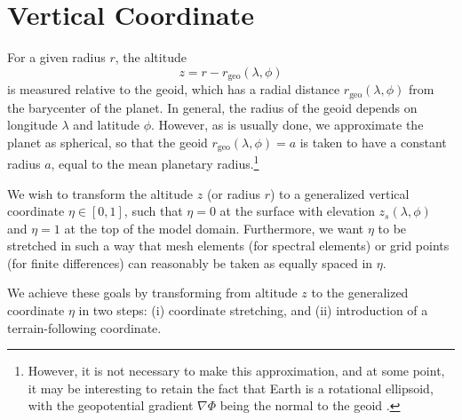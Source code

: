 \documentclass{report}
\begin{document}
% 

\section{Vertical Coordinate}

For a given radius $r$, the altitude 
\begin{equation}
    z = r - r_\mathrm{geo}(\lambda,\phi)
\end{equation}
is measured relative to the geoid, which has a radial distance $r_\mathrm{geo}(\lambda,\phi)$ from the barycenter of the planet. In general, the radius of the geoid depends on longitude $\lambda$ and latitude $\phi$. However, as is usually done, we approximate the planet as spherical, so that the geoid $r_\mathrm{geo}(\lambda,\phi) = a$ is taken to have a constant radius $a$, equal to the mean planetary radius.\footnote{However, it is not necessary to make this approximation, and at some point, it may be interesting to retain the fact that Earth is a rotational ellipsoid, with the geopotential gradient $\nabla \Phi$ being the normal to the geoid \citep{Baldauf20a}.}

We wish to transform the altitude $z$ (or radius $r$) to a generalized vertical coordinate $\eta \in [0, 1]$, such that $\eta=0$ at the surface with elevation $z_s(\lambda, \phi)$  and $\eta=1$ at the top of the model domain. Furthermore, we want $\eta$ to be stretched in such a way that mesh elements (for spectral elements) or grid points (for finite differences) can reasonably be taken as equally spaced in $\eta$. 

We achieve these goals by transforming from altitude $z$ to the generalized coordinate $\eta$ in two steps: (i) coordinate stretching, and (ii) introduction of a terrain-following coordinate.
\end{document}
